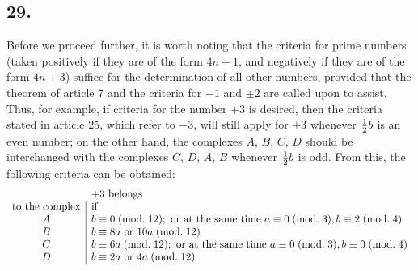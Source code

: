 \documentclass[twoside,12pt]{memoir}
\renewcommand{\pmod}[1]{\;(\textrm{mod.}\;#1)}
\let\oldfrac\frac
\def\frac#1#2{\mathchoice{\tfrac{#1}{#2}}{\oldfrac{#1}{#2}}{\genfrac{}{}{}{2}{#1}{#2\mathstrut}}{\genfrac{}{}{}{3}{#1}{#2\mathstrut}}}
\begin{document}
\subsection*{29.}
Before we proceed further, it is worth noting that the criteria for prime numbers (taken positively if they are of the form \(4n+1\), and negatively if they are of the form \(4n+3\)) suffice for the determination of all other numbers, provided that the theorem of article 7 and the criteria for \(-1\) and \(\pm 2\) are called upon to assist. Thus, for example, if criteria for the number \(+3\) is desired, then the criteria stated in article 25, which refer to \(-3\), will still apply for \(+3\) whenever \(\frac{1}{2}b\) is an even number; on the other hand, the complexes \(A\), \(B\), \(C\), \(D\) should be interchanged with the complexes \(C\), \(D\), \(A\), \(B\) whenever \(\frac{1}{2}b\) is odd. From this, the following criteria can be obtained:
\[\begin{array}{c|l}
\multicolumn{1}{c}{}&\multicolumn{1}{l}{+3\text{ belongs}}\\
\text{to the complex}&\text{if}\\
A & b \equiv 0\pmod{12}; \text{ or at the same time } a \equiv 0\pmod{3}, b \equiv 2\pmod{4} \\
B & b \equiv 8 a \text{ or } 10 a\pmod{12} \\
C & b \equiv 6 a\pmod{12}; \text{ or at the same time } a \equiv 0\pmod{3}, b \equiv 0\pmod{4} \\
D & b \equiv 2 a \text{ or } 4 a\pmod{12}
\end{array}\]
%
\end{document}
